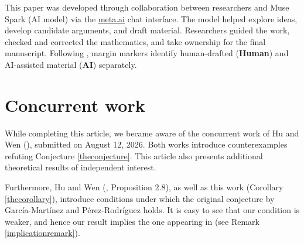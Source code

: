 \documentclass[11pt]{article}
\newcommand{\HumanLabel}{
({\bfseries\sffamily\color{humancolor!70}Human})
}
\newcommand{\AILabel}{
({\bfseries\sffamily\color{aicolor!70}AI})
}
\theoremstyle{definition}
\numberwithin{equation}{section}
\begin{document}
\begin{humanblock}
This paper was developed through collaboration between researchers and Muse Spark (AI model) via the \href{http://meta.ai}{meta.ai} chat interface. The model helped explore ideas, develop candidate arguments, and draft material. Researchers guided the work, checked and corrected the mathematics, and take ownership for the final manuscript. Following \cite{schmitt2025extremal}, margin markers identify human-drafted \!\!\HumanLabel and AI-assisted material \!\!\AILabel separately.
\end{humanblock}

\section*{Concurrent work}
\begin{humanblock}
While completing this article, we became aware of the concurrent work of Hu and Wen (\cite{HW}), submitted on August 12, 2026. Both works introduce counterexamples refuting Conjecture \ref{theconjecture}. This article also presents additional theoretical results of independent interest.

Furthermore, Hu and Wen (\cite{HW}, Proposition 2.8), as well as this work (Corollary \ref{thecorollary}), introduce conditions under which the original conjecture by Garc\'ia-Mart\'inez and P\'erez-Rodr\'iguez holds. It is easy to see that our condition is weaker, and hence our result implies the one appearing in \cite{HW} (see Remark \ref{implicationremark}).
\end{humanblock}
\end{document}
